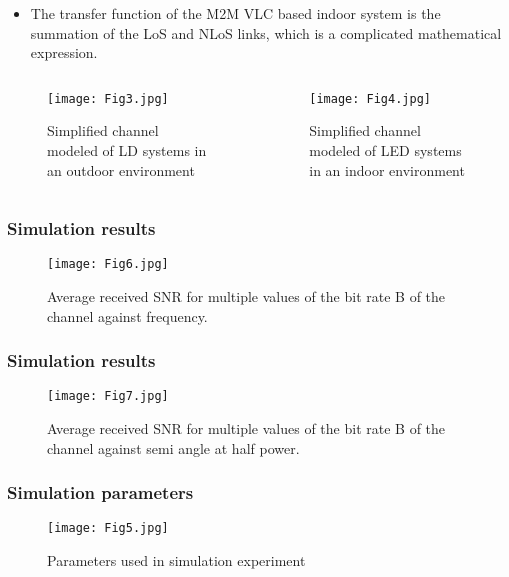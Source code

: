 \documentclass{beamer}
\begin{document}
\begin{frame}
  \frametitle{}
  \begin{block}{}
  \begin{itemize}
      \item The transfer function of the M2M VLC based indoor system is the summation of the LoS and NLoS links, which is a complicated mathematical expression.
  \end{itemize}
    \end{block}
    \begin{columns}
	\begin{column}{0.48\textwidth}
		\begin{figure}[h]
    \texttt{[image: Fig3.jpg]}
    \caption{Simplified channel modeled of LD systems in an outdoor environment}
        \end{figure}
	\end{column}
	\begin{column}{0.48\textwidth}
	\begin{figure} [h]
    \texttt{[image: Fig4.jpg]}
    \caption{Simplified channel modeled of LED systems in an indoor environment}
    \end{figure}	
	\end{column}
\end{columns}
\end{frame}

\begin{frame}
  \frametitle{Simulation results}
		\begin{figure}[h]
    \texttt{[image: Fig6.jpg]}
    \caption{Average received SNR for multiple values of the bit rate B of the channel against frequency.}
        \end{figure}
\end{frame}

\begin{frame}
  \frametitle{Simulation results}
  \begin{figure} [h]
    \texttt{[image: Fig7.jpg]}
    \caption{Average received SNR for multiple values of the bit rate B of the channel against semi angle at half power.}
    \end{figure}
\end{frame}

\begin{frame}
  \frametitle{Simulation parameters}
  \begin{figure} [h]
    \texttt{[image: Fig5.jpg]}
    \caption{Parameters used in simulation experiment}
    \end{figure}
\end{frame}
\end{document}
